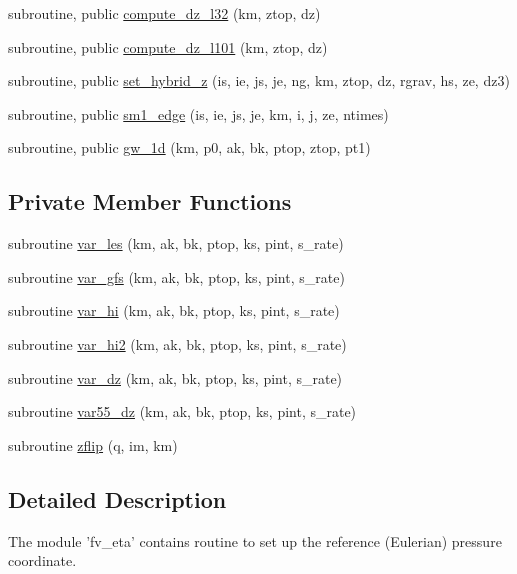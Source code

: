 \begin{DoxyCompactItemize}
\item 
subroutine, public \hyperlink{classfv__eta__mod_a053b0ba1233d84a26d711e5eb52067d6}{compute\-\_\-dz\-\_\-l32} (km, ztop, dz)
\item 
subroutine, public \hyperlink{classfv__eta__mod_a9a86c1048a7447b78e476bdc8779c66b}{compute\-\_\-dz\-\_\-l101} (km, ztop, dz)
\item 
subroutine, public \hyperlink{classfv__eta__mod_a3cc1b049b1ea1a7946fe7822d487b96e}{set\-\_\-hybrid\-\_\-z} (is, ie, js, je, ng, km, ztop, dz, rgrav, hs, ze, dz3)
\item 
subroutine, public \hyperlink{classfv__eta__mod_a28257151239cbcf2109332794c3c8ca7}{sm1\-\_\-edge} (is, ie, js, je, km, i, j, ze, ntimes)
\item 
subroutine, public \hyperlink{classfv__eta__mod_a700124642759a074f906c37e97759143}{gw\-\_\-1d} (km, p0, ak, bk, ptop, ztop, pt1)
\end{DoxyCompactItemize}
\subsection*{Private Member Functions}
\begin{DoxyCompactItemize}
\item 
subroutine \hyperlink{classfv__eta__mod_a485f88952280ceb9c730bc2ed08c3078}{var\-\_\-les} (km, ak, bk, ptop, ks, pint, s\-\_\-rate)
\item 
subroutine \hyperlink{classfv__eta__mod_a6ec582f058a1d23edd2b7d79edd78ee5}{var\-\_\-gfs} (km, ak, bk, ptop, ks, pint, s\-\_\-rate)
\item 
subroutine \hyperlink{classfv__eta__mod_a8c6950ee0b7fd66c1b35de24dc7d6d17}{var\-\_\-hi} (km, ak, bk, ptop, ks, pint, s\-\_\-rate)
\item 
subroutine \hyperlink{classfv__eta__mod_ad5e4e4a50f8c29c986a4093990d46442}{var\-\_\-hi2} (km, ak, bk, ptop, ks, pint, s\-\_\-rate)
\item 
subroutine \hyperlink{classfv__eta__mod_af1838090c58f286a4c66ce76a7d6b55a}{var\-\_\-dz} (km, ak, bk, ptop, ks, pint, s\-\_\-rate)
\item 
subroutine \hyperlink{classfv__eta__mod_a59a8fe6b8a243e7bd30a030d13f13658}{var55\-\_\-dz} (km, ak, bk, ptop, ks, pint, s\-\_\-rate)
\item 
subroutine \hyperlink{classfv__eta__mod_a794583ebdb4823bcbdde4cca4b019f91}{zflip} (q, im, km)
\end{DoxyCompactItemize}


\subsection{Detailed Description}
The module 'fv\-\_\-eta' contains routine to set up the reference (Eulerian) pressure coordinate. 

